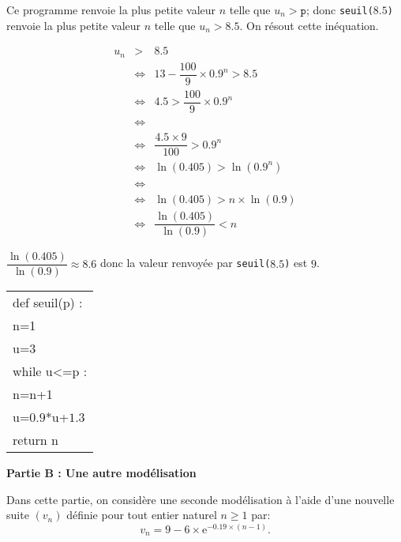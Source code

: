\begin{minipage}{0.62\linewidth}
\begin{enumerate}
{\begin{minipage}{0.72\linewidth}
Ce programme renvoie la plus petite valeur $n$ telle que $u_n>\texttt{p}$; donc \texttt{seuil($8.5$)} renvoie la plus petite valeur $n$ telle que $u_n>8.5$. On résout cette inéquation.

\begin{eqnarray*}
u_n&>&8.5 \\
& \iff &13 -\dfrac{100}{9}\times 0.9^n > 8.5\\
& \iff & 4.5 > \dfrac{100}{9}\times 0.9^n\\
& \iff &\phantom{u_n>8.5}  \\
& \iff & \dfrac{4.5\times 9}{100}> 0.9^n \\
& \iff &\ln(0.405) > \ln \left (0.9^n\right )\\
& \iff &\phantom{u_n>8.5} \\
& \iff &\ln(0.405) >n \times \ln  (0.9) \\
& \iff &\dfrac{\ln(0.405)}{\ln(0.9)} <n
\end{eqnarray*}

\end{minipage}\hfill


$\dfrac{\ln(0.405)}{\ln(0.9)} \approx 8.6$ donc la valeur renvoyée par \texttt{seuil($8.5$)} est $9$.
} %

\end{enumerate}
\end{minipage}\hfill
\begin{minipage}{0.32\linewidth}
\renewcommand\arraystretch{0.9}

\begin{tabular}{|l|} \hline
def seuil(p) :\\
\qquad n=1\\
\qquad u=$3$\\
\qquad while u<=p :\\
\qquad  \qquad n=n+1\\
\qquad \qquad u=$0.9$*u+$1.3$ \\
\qquad return n\\ \hline
\end{tabular}
\end{minipage}

\bigskip

\textbf{Partie B : Une autre modélisation}

\medskip

Dans cette partie, on considère une seconde modélisation à l'aide d'une nouvelle
suite $\left(v_n\right)$ définie pour tout entier naturel $n \geqslant 1$ par:
\[v_n = 9 - 6 \times \text{e}^{-0.19\times(n - 1)}.\]

